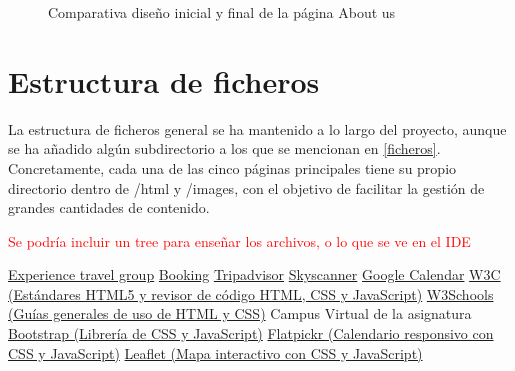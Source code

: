 \documentclass[11pt, a4paper]{book}
\begin{document}
\begin{figure} [H]
\begin{minipage}[c]{0.45\textwidth}
		\end{minipage}
		\caption{Comparativa diseño inicial y final de la página About us}
	\end{figure}
	
	
	\section{Estructura de ficheros}
	La estructura de ficheros general se ha mantenido a lo largo del proyecto, aunque se ha añadido algún subdirectorio a los que se mencionan en \ref{ficheros}. Concretamente, cada una de las cinco páginas principales tiene su propio directorio dentro de /html y /images, con el objetivo de facilitar la gestión de grandes cantidades de contenido.
	
	\begin{huge}
		\textcolor{red}{Se podría incluir un tree para enseñar los archivos, o lo que se ve en el IDE}
	\end{huge}

	\begin{thebibliography}{9}
		 \href{https://experiencetravelgroup.com}{Experience travel group}
		 \href{https://booking.com}{Booking}
		 \href{https://tripadvisor.es}{Tripadvisor}
		 \href{https://skyscanner.es}{Skyscanner}
		 \href{https://calendar.google.com/calendar/u/0/r}{Google Calendar}
		 \href{https://html.spec.whatwg.org/multipage/}{W3C (Estándares HTML5 y revisor de código HTML, CSS y JavaScript)}
		 \href{https://www.w3schools.com/}{W3Schools (Guías generales de uso de HTML y CSS)} 
		 Campus Virtual de la asignatura
		 \href{https://getbootstrap.com/}{Bootstrap (Librería de CSS y JavaScript)}
		 \href{https://flatpickr.js.org/}{Flatpickr (Calendario responsivo con CSS y JavaScript)}
         \href{https://leafletjs.com/}{Leaflet (Mapa interactivo con CSS y JavaScript)}
	\end{thebibliography}
\end{document}

